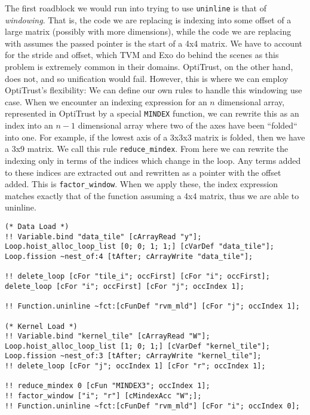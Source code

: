 \documentclass[acmsmall, nonacm=true]{acmart}
\begin{document}
The first roadblock we would run into trying to use \verb|uninline| is that of \textit{windowing}. That is, the code we are replacing is indexing into some offset of a large matrix (possibly with more dimensions), while the code we are replacing with assumes the passed pointer is the start of a 4x4 matrix. We have to account for the stride and offset, which TVM and Exo do behind the scenes as this problem is extremely common in their domains. OptiTrust, on the other hand, does not, and so unification would fail. However, this is where we can employ OptiTrust's flexibility: We can define our own rules to handle this windowing use case. When we encounter an indexing expression for an $n$ dimensional array, represented in OptiTrust by a special \verb|MINDEX| function, we can rewrite this as an index into an $n-1$ dimensional array where two of the axes have been ``folded`` into one. For example, if the lowest axis of a 3x3x3 matrix is folded, then we have a 3x9 matrix. We call this rule \verb|reduce_mindex|. From here we can rewrite the indexing only in terms of the indices which change in the loop. Any terms added to these indices are extracted out and rewritten as a pointer with the offset added. This is \verb|factor_window|. When we apply these, the index expression matches exactly that of the function assuming a 4x4 matrix, thus we are able to uninline.
\begin{listing}
    \begin{verbatim}
(* Data Load *)
!! Variable.bind "data_tile" [cArrayRead "y"];
Loop.hoist_alloc_loop_list [0; 0; 1; 1;] [cVarDef "data_tile"];
Loop.fission ~nest_of:4 [tAfter; cArrayWrite "data_tile"];

!! delete_loop [cFor "tile_i"; occFirst] [cFor "i"; occFirst];
delete_loop [cFor "i"; occFirst] [cFor "j"; occIndex 1];

!! Function.uninline ~fct:[cFunDef "rvm_mld"] [cFor "j"; occIndex 1];

(* Kernel Load *)
!! Variable.bind "kernel_tile" [cArrayRead "W"];
Loop.hoist_alloc_loop_list [1; 0; 1;] [cVarDef "kernel_tile"];
Loop.fission ~nest_of:3 [tAfter; cArrayWrite "kernel_tile"];
!! delete_loop [cFor "j"; occIndex 1] [cFor "r"; occIndex 1];

!! reduce_mindex 0 [cFun "MINDEX3"; occIndex 1];
!! factor_window ["i"; "r"] [cMindexAcc "W";];
!! Function.uninline ~fct:[cFunDef "rvm_mld"] [cFor "i"; occIndex 0];
\end{verbatim}
\caption{Staging and offloading of data and kernel loads.}
\label{lst:conv1d_optitrust_data_kernel}
\end{listing}
\end{document}
